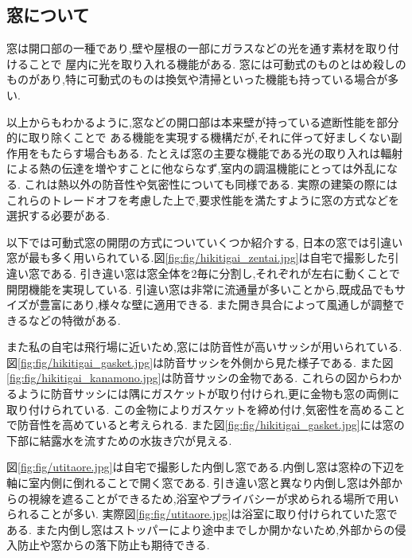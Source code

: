 \subsection*{窓について}
窓は開口部の一種であり,壁や屋根の一部にガラスなどの光を通す素材を取り付けることで
屋内に光を取り入れる機能がある.
窓には可動式のものとはめ殺しのものがあり,特に可動式のものは換気や清掃といった機能も持っている場合が多い.

以上からもわかるように,窓などの開口部は本来壁が持っている遮断性能を部分的に取り除くことで
ある機能を実現する機構だが,それに伴って好ましくない副作用をもたらす場合もある.
たとえば窓の主要な機能である光の取り入れは輻射による熱の伝達を増やすことに他ならなず,室内の調温機能にとっては外乱になる.
これは熱以外の防音性や気密性についても同様である.
実際の建築の際にはこれらのトレードオフを考慮した上で,要求性能を満たすように窓の方式などを選択する必要がある.

以下では可動式窓の開閉の方式についていくつか紹介する,
日本の窓では引違い窓が最も多く用いられている.\cite{mado:online}図\ref{fig:fig/hikitigai_zentai.jpg}は自宅で撮影した引違い窓である.
引き違い窓は窓全体を2毎に分割し,それぞれが左右に動くことで開閉機能を実現している.
引違い窓は非常に流通量が多いことから,既成品でもサイズが豊富にあり,様々な壁に適用できる.
また開き具合によって風通しが調整できるなどの特徴がある.

また私の自宅は飛行場に近いため,窓には防音性が高いサッシが用いられている.
図\ref{fig:fig/hikitigai_gasket.jpg}は防音サッシを外側から見た様子である.
また図\ref{fig:fig/hikitigai_kanamono.jpg}は防音サッシの金物である.
これらの図からわかるように防音サッシには隅にガスケットが取り付けられ,更に金物も窓の両側に取り付けられている.
この金物によりガスケットを締め付け,気密性を高めることで防音性を高めていると考えられる.
また図\ref{fig:fig/hikitigai_gasket.jpg}には窓の下部に結露水を流すための水抜き穴が見える.

図\ref{fig:fig/utitaore.jpg}は自宅で撮影した内倒し窓である.内倒し窓は窓枠の下辺を軸に室内側に倒れることで開く窓である.
引き違い窓と異なり内倒し窓は外部からの視線を遮ることができるため,浴室やプライバシーが求められる場所で用いられることが多い.\cite{mado:online}
実際図\ref{fig:fig/utitaore.jpg}は浴室に取り付けられていた窓である.
また内倒し窓はストッパーにより途中までしか開かないため,外部からの侵入防止や窓からの落下防止も期待できる.\cite{utitaosi:online}
